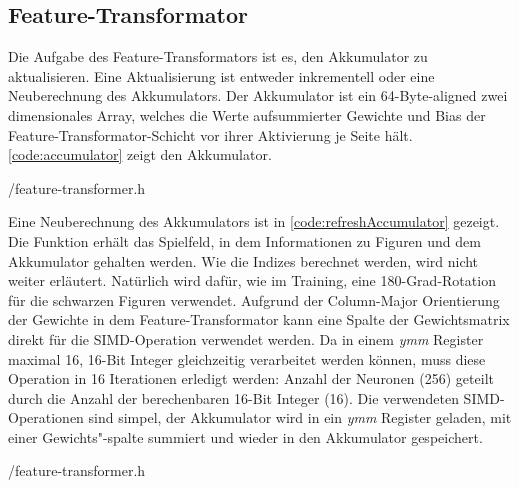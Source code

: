 \subsection{Feature-Transformator}

Die Aufgabe des Feature-Transformators ist es, den Akkumulator zu aktualisieren. Eine Aktualisierung ist entweder inkrementell oder eine Neuberechnung des Akkumulators. Der Akkumulator ist ein 64-Byte-aligned zwei dimensionales Array, welches die Werte aufsummierter Gewichte und Bias der Feature-Transformator-Schicht vor ihrer Aktivierung je Seite hält. \autoref{code:accumulator} zeigt den Akkumulator.


{\srcloc/feature-transformer.h}

Eine Neuberechnung des Akkumulators ist in \autoref{code:refreshAccumulator} gezeigt. Die Funktion erhält das Spielfeld, in dem Informationen zu \zb{} Figuren und dem Akkumulator gehalten werden. Wie die Indizes berechnet werden, wird nicht weiter erläutert. Natürlich wird dafür, wie im Training, eine 180-Grad-Rotation für die schwarzen Figuren verwendet. Aufgrund der Column-Major Orientierung der Gewichte in dem Feature-Transformator kann eine Spalte der Gewichtsmatrix direkt für die \ac{SIMD}-Operation verwendet werden. Da in einem \emph{ymm} Register maximal 16, 16-Bit Integer gleichzeitig verarbeitet werden können, muss diese Operation in 16 Iterationen erledigt werden: Anzahl der Neuronen (256) geteilt durch die Anzahl der berechenbaren 16-Bit Integer (16). Die verwendeten \ac{SIMD}-Operationen sind simpel, der Akkumulator wird in ein \emph{ymm} Register geladen, mit einer Gewichts"-spalte summiert und wieder in den Akkumulator gespeichert.


{\srcloc/feature-transformer.h}

